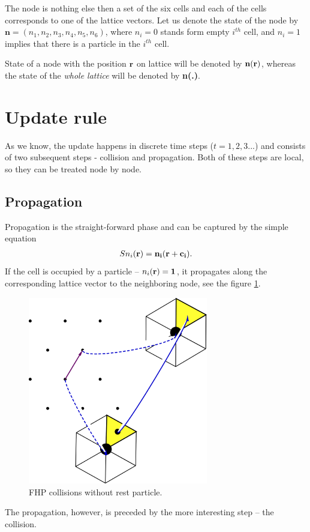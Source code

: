 The node is nothing else then a set of the six cells and each of the cells corresponds to one of the lattice vectors.
Let us denote the state of the node by $\bm{n} = (n_1,n_2,n_3,n_4,n_5,n_6)$, where $n_i = 0$ stands form empty $i^{th}$ cell, and $n_i = 1$ implies that there is a particle in the $i^{th}$ cell. 

State of a node with the position $\bf{r}$ on lattice will be denoted by $\bf{n(r)}$, whereas the state of the \textit{whole lattice} will be denoted by \textbf{n(.)}.

\section{Update rule}
As we know, the update happens in discrete time steps ($t=1,2,3...$) and consists of two subsequent steps - collision and propagation. Both of these steps are local, so they can be treated node by node.

\subsection{Propagation}

Propagation is the straight-forward phase and can be captured by the simple equation
\begin{align*}
S n_i(\bf{r}) = n_i(\bf{r + c_i}). 
\end{align*}
If the cell is occupied by a particle -- $n_i(\bf{r})=1$, it propagates along the corresponding lattice vector to the neighboring node, see the figure \ref{FHPprop}.

\begin{figure}[H]
 \centering
 \includegraphics[width=0.7\textwidth]{./img/FHPprop}
 \caption{FHP collisions without rest particle.}
 \label{FHPprop}
\end{figure}
The propagation, however, is preceded by the more interesting step -- the collision.

